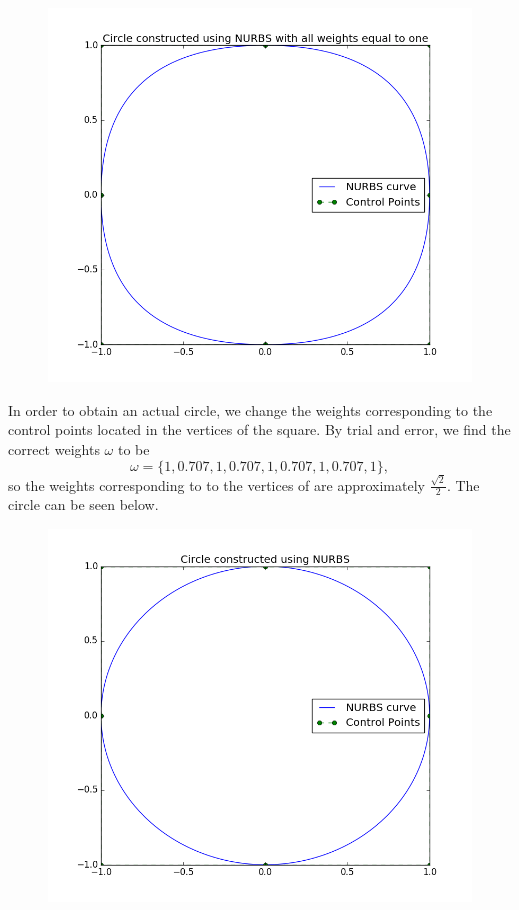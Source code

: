 \documentclass[]{article}
\begin{document}
\begin{figure}[h!]
	\includegraphics[scale=0.6]{splinecircle}
\end{figure}
In order to obtain an actual circle, we change the weights corresponding to the control points located in the vertices of the square. By trial and error, we find the correct weights $\omega$ to be \begin{equation*}
\omega= \{1, 0.707, 1, 0.707, 1, 0.707, 1, 0.707, 1\},
\end{equation*}
so the weights corresponding to to the vertices of are approximately $\frac{\sqrt{2}}{2}$. The circle can be seen below.
\begin{figure}[h!]
	\includegraphics[scale=0.6]{nurbscircle}
\end{figure}
\end{document}
